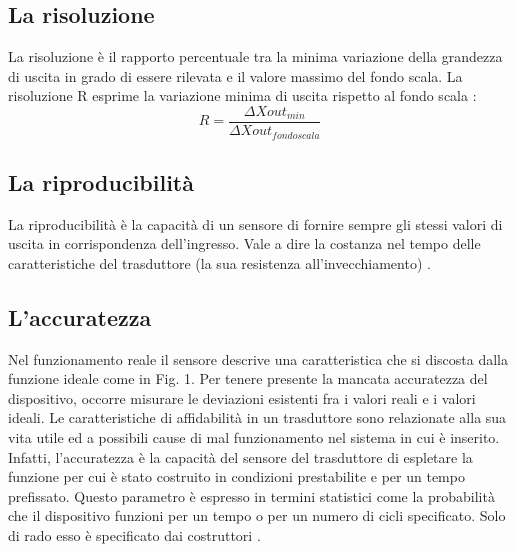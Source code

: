 \documentclass[a4paper]{report} %
\begin{document}
\subsection{La risoluzione}
La risoluzione è il rapporto percentuale tra la minima variazione della grandezza di uscita in grado di essere rilevata e il valore massimo del fondo scala.
La risoluzione R esprime la variazione minima di uscita rispetto al fondo scala \cite{art:rif.11}:
\begin{equation}
R = \frac{\Delta Xout_{min}}{\Delta Xout_{fondo scala}} 
\end{equation} 


\subsection{La riproducibilità}
La riproducibilità è la capacità di un sensore di fornire sempre gli stessi valori di uscita in corrispondenza dell'ingresso. Vale a dire la costanza nel tempo delle caratteristiche del trasduttore (la sua resistenza all'invecchiamento) \cite{art:rif.11}. 

\subsection{L'accuratezza}
Nel funzionamento reale il sensore descrive una caratteristica che si discosta dalla funzione ideale come in Fig. 1. Per tenere presente la mancata accuratezza del dispositivo, occorre misurare le deviazioni esistenti fra i valori reali e i valori ideali. Le caratteristiche di affidabilità in un trasduttore sono relazionate alla sua vita utile ed a possibili cause di mal funzionamento nel sistema in cui è inserito. Infatti, l'accuratezza è la capacità del sensore del trasduttore di espletare la funzione per cui è stato costruito in condizioni prestabilite e per un tempo prefissato. Questo parametro è espresso in termini statistici come la probabilità che il dispositivo funzioni per un tempo o per un numero di cicli specificato. Solo di rado esso è specificato dai costruttori \cite{art:rif.12, art:rif.13}. 
\end{document}
